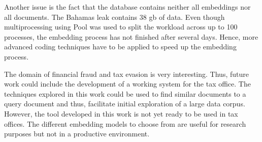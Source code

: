 Another issue is the fact that the database contains neither all embeddings nor all documents.
The Bahamas leak contains 38 \ac{gb} of data.
Even though multiprocessing using Pool was used to split the workload across up to 100 processes, 
the embedding process has not finished after several days.
Hence, more advanced coding techniques have to be applied to speed up the embedding process.

The domain of financial fraud and tax evasion is very interesting.
Thus, future work could include the development of a working system for the tax office.
The techniques explored in this work could be used to find similar documents to a query document and thus,
facilitate initial exploration of a large data corpus.
However, the tool developed in this work is not yet ready to be used in tax offices.
The different embedding models to choose from are useful for research purposes but not in a productive environment.
